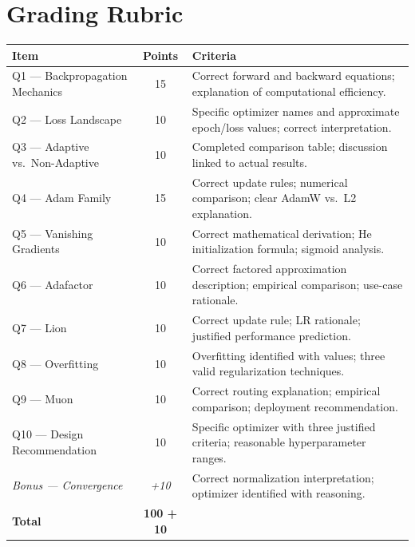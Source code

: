 \documentclass[12pt,a4paper]{article}
\begin{document}
\section*{Grading Rubric}

\begin{center}
\renewcommand{\arraystretch}{1.3}
\begin{tabular}{|p{4cm}|c|p{9cm}|}
\hline
\textbf{Item} & \textbf{Points} & \textbf{Criteria} \\
\hline
Q1 — Backpropagation Mechanics & 15 &
  Correct forward and backward equations; explanation of computational efficiency. \\
\hline
Q2 — Loss Landscape & 10 &
  Specific optimizer names and approximate epoch/loss values; correct interpretation. \\
\hline
Q3 — Adaptive vs.\ Non-Adaptive & 10 &
  Completed comparison table; discussion linked to actual results. \\
\hline
Q4 — Adam Family & 15 &
  Correct update rules; numerical comparison; clear AdamW vs.\ L2 explanation. \\
\hline
Q5 — Vanishing Gradients & 10 &
  Correct mathematical derivation; He initialization formula; sigmoid analysis. \\
\hline
Q6 — Adafactor & 10 &
  Correct factored approximation description; empirical comparison; use-case rationale. \\
\hline
Q7 — Lion & 10 &
  Correct update rule; LR rationale; justified performance prediction. \\
\hline
Q8 — Overfitting & 10 &
  Overfitting identified with values; three valid regularization techniques. \\
\hline
Q9 — Muon & 10 &
  Correct routing explanation; empirical comparison; deployment recommendation. \\
\hline
Q10 — Design Recommendation & 10 &
  Specific optimizer with three justified criteria; reasonable hyperparameter ranges. \\
\hline
\textit{Bonus — Convergence} & \textit{+10} &
  Correct normalization interpretation; optimizer identified with reasoning. \\
\hline
\textbf{Total} & \textbf{100 + 10} & \\
\hline
\end{tabular}
\end{center}
\end{document}
